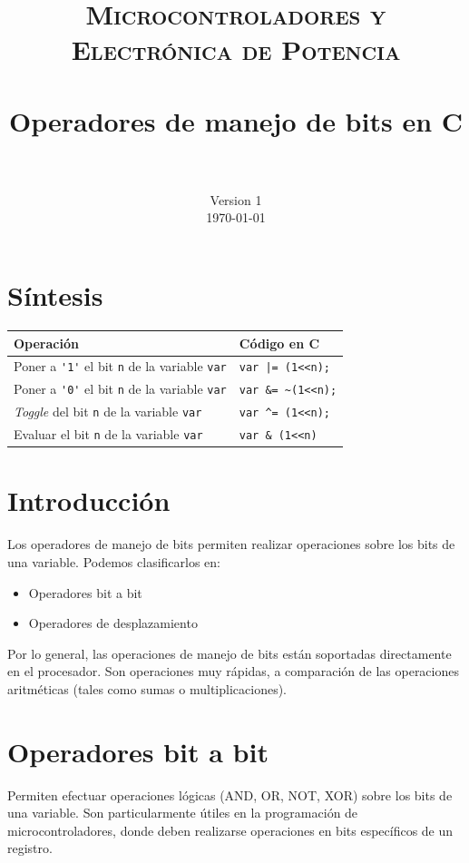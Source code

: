 \documentclass[paper=a4, fontsize=11pt]{scrartcl}	%
\title{%
		\usefont{OT1}{bch}{b}{n}
		\normalfont \normalsize \textsc{Microcontroladores y Electrónica de
    Potencia} \\ [25pt]
		\horrule{0.5pt} \\[0.4cm]
		\huge Operadores de manejo de bits en C\\
		\horrule{2pt} \\[0.5cm]
}
\author{%
		\normalfont 								\normalsize
        Version 1 \\[-3pt]		\normalsize
        \today
}
\date{}
\numberwithin{equation}{section} %
\numberwithin{figure}{section} %
\numberwithin{table}{section} %
\begin{document}
\maketitle

\section{Síntesis}

\begin{table}[h]
  \centering
  \begin{tabular} {l | l}
    \hline
    \textbf{Operación} & \textbf{Código en C} \\ \hline
    Poner a \verb|'1'| el bit \verb|n| de la variable \verb|var| & \verb!var |= (1<<n);! \\
    Poner a \verb|'0'| el bit \verb|n| de la variable \verb|var| & \verb!var &= ~(1<<n);! \\
    \emph{Toggle} del bit \verb|n| de la variable   \verb|var| & \verb!var ^= (1<<n);! \\
    Evaluar el bit \verb|n| de la variable   \verb|var| & \verb!var & (1<<n)! \\
    \hline
  \end{tabular}
\end{table}

\section{Introducción}

Los operadores de manejo de bits permiten realizar operaciones sobre los
bits de una variable.
Podemos clasificarlos en:
\begin{itemize}
  \item Operadores {bit a bit}
  \item Operadores de desplazamiento
\end{itemize}
Por lo general, las operaciones de manejo de bits están soportadas
directamente en el procesador. Son operaciones muy rápidas, a
comparación de las operaciones aritméticas (tales como sumas o
multiplicaciones).

\section{Operadores bit a bit}

Permiten efectuar operaciones lógicas (AND, OR, NOT, XOR) sobre los bits
de una variable. Son particularmente útiles en la programación de
microcontroladores, donde deben realizarse operaciones en bits
específicos de un registro.
\end{document}
